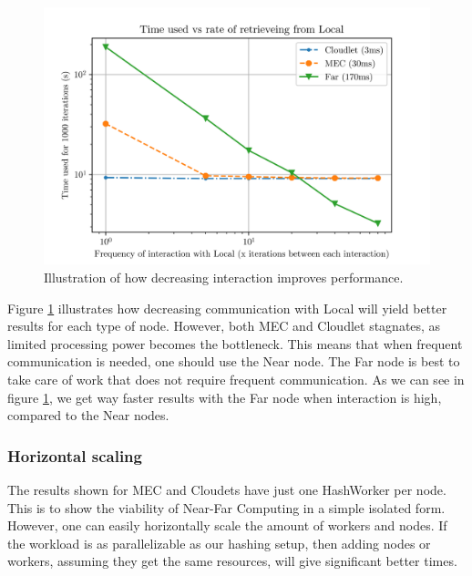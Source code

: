 \begin{figure}
    \centering
    \includegraphics{chapters/6_evaluation/figures/All_latency.png}
    \caption{Illustration of how decreasing interaction improves performance.}
    \label{fig:all_graph_decrease}
\end{figure}

Figure \ref{fig:all_graph_decrease} illustrates how decreasing communication with Local will yield better results for each type of node. However, both MEC and Cloudlet stagnates, as limited processing power becomes the bottleneck. This means that when frequent communication is needed, one should use the Near node. The Far node is best to take care of work that does not require frequent communication. As we can see in figure \ref{fig:all_graph_decrease}, we get way faster results with the Far node when interaction is high, compared to the Near nodes.





\subsubsection{Horizontal scaling}
The results shown for MEC and Cloudets have just one HashWorker per node. This is to show the viability of Near-Far Computing in a simple isolated form. However, one can easily horizontally scale the amount of workers and nodes. If the workload is as parallelizable as our hashing setup, then adding nodes or workers, assuming they get the same resources, will give significant better times.

